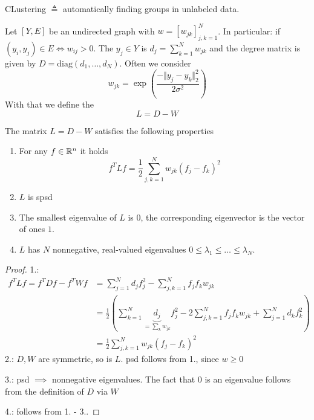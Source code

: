 CLustering $\triangleq $ automatically finding groups in unlabeled data.

Let $[Y,E]$ be an undirected graph with  $w=[w_{jk}]_{j,k=1}^N$.
In particular: if $(y_i,y_j)\in E\iff w_{ij}>0$. The  $y_j\in Y$ is $d_j=\sum_{k=1}^N w_{jk}$ 
and the degree matrix is given by $D=\text{diag}(d_1,\dots,d_N)$. Often we consider 
\[w_{jk}=\exp\left(\frac{-\Vert y_j-y_k\Vert_2^2}{2\sigma^2}\right)\]
With that we define the  
\[L=D-W\]

\begin{theorem}\label{thm:2.22}
    The matrix $L=D-W$ satisfies the following properties
    \begin{enumerate}
        \item For any $f\in\mathbb{R}^n$ it holds \[f^T L f = \frac{1}{2}\sum_{j,k=1}^N w_{jk}(f_j-f_k)^2\]
        \item $L$ is spsd 
        \item The smallest eigenvalue of $L$ is $0$, the corresponding eigenvector is the vector of ones $1$.
        \item $L$ has $N$ nonnegative, real-valued eigenvalues $0\leq\lambda_1\leq \dots\leq \lambda_N$.
    \end{enumerate}
\end{theorem}

\begin{proof}

    1.:
    \begin{align*}
        f^T L f = f^T D f - f^TWf &= \sum_{j=1}^N d_j f_j^2 - \sum_{j,k=1}^N f_j f_k w_{jk}\\
        &=\frac{1}{2} \left(\sum_{k=1}^N \underbrace{d_j}_{=\sum_{k} w_{jk}} f_j^2-2\sum_{j,k=1}^N f_j f_k w_{jk}+ \sum_{j=1}^N d_k f_k^2 \right)\\
        &=\frac{1}{2}\sum_{j,k=1}^N w_{jk}(f_j-f_k)^2
    \end{align*}
    2.: $D,W$ are symmetric, so is $L$. psd follows from 1., since $w\geq 0$

    3.: psd $\implies$ nonnegative eigenvalues. The fact that $0$ is an eigenvalue follows from the definition of $D$ via $W$
    
    4.: follows from 1. - 3..
\end{proof}


